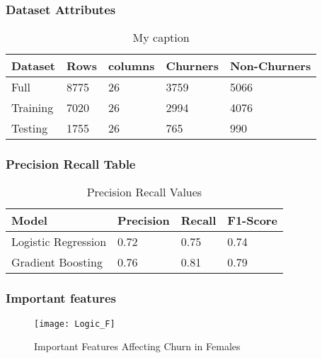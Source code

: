 \documentclass[
10pt, %
a4paper, %
oneside, %
headinclude,footinclude, %
BCOR5mm, %
]{scrartcl}
\begin{document}
\subsubsection{Dataset Attributes}
\begin{table}[H]
\centering
\caption{My caption}
\label{my-label}
\begin{tabular}{@{}lllll@{}}
\toprule
Dataset  & Rows  & columns & Churners & Non-Churners \\ \midrule
Full     & 8775 & 26      & 3759     & 5066        \\
Training & 7020 & 26      & 2994     & 4076         \\
Testing  & 1755  & 26      & 765        & 990         \\ \bottomrule
\end{tabular}
\end{table}

\subsubsection{Precision Recall Table}

\begin{table}[H]
\centering
\caption{Precision Recall Values}
\label{my-label}
\begin{tabular}{@{}llll@{}}
\toprule
Model               & Precision & Recall & F1-Score \\ \midrule
Logistic Regression & 0.72      & 0.75   & 0.74     \\
Gradient Boosting   & 0.76      & 0.81   & 0.79     \\  \bottomrule
\end{tabular}
\end{table}

\subsubsection{Important features}
\begin{figure}[H]
\centering 
\texttt{[image: Logic\_F]} 
\caption[Lostic Regression Confusion Matrix]{Important Features Affecting Churn in Females} %
\label{fig:gallery} 
\end{figure}


\newpage
\end{document}

